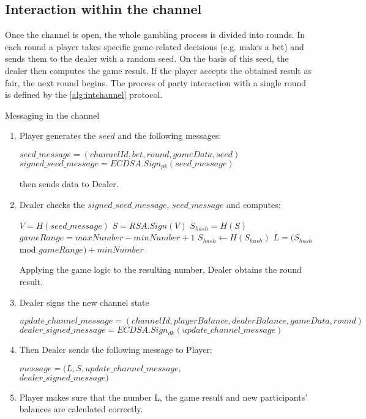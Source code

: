 \subsection {Interaction within the channel}

Once the channel is open, the whole gambling process is divided into rounds. In each round a player takes specific game-related decisions (e.g. makes a bet) and sends them to the dealer with a random seed. On the basis of this seed, the dealer then computes the game result. If the player accepts the obtained result as fair, the next round begins. The process of party interaction with a single round is defined by the \autoref{alg:intchannel} protocol. 

\begin{algorithm}
\caption{Messaging in the channel} \label{alg:intchannel}
\begin{enumerate}
	\item Player generates the $seed$ and the following  messages:
\begin{center}
$ seed\_message = (channelId, bet, round, gameData, seed)$
$signed\_seed\_message = ECDSA.Sign_{pk}(seed\_message)$ 
\end{center}
 then sends data to Dealer. 
	\item Dealer checks the $signed\_seed\_message$, $seed\_message$ and computes:
 \begin{algorithmic}
\State $V = H(seed\_message)$
\State $S = RSA.Sign(V)$
\State $S_{hash} = H(S)$
\State $gameRange = maxNumber -  minNumber + 1$
\State$ S_{hash}\gets H(S_{hash})$
\EndWhile
\State $L = (S_{hash}$ mod $gameRange) + minNumber$
 \end{algorithmic}
 Applying the game logic to the resulting number, Dealer obtains the round result.
\item Dealer signs the new channel state
\begin{center}
$update\_channel\_message = (channelId, playerBalance, dealerBalance, gameData, round)$
$dealer\_signed\_message = ECDSA.Sign_{dk}(update\_channel\_message)$
\end{center}
\item Then Dealer sends the following message to Player:
\begin{center}
 $message = (L,S, update\_channel\_message, $ \\ $dealer\_signed\_message)$
\end{center}
	\item Player makes sure that the number L, the game result and new participants' balances are calculated correctly.
\end{enumerate}
\end{algorithm}


